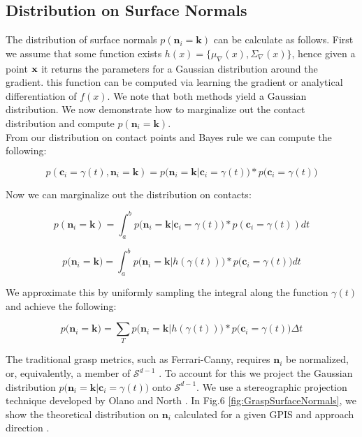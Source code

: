 \documentclass[letterpaper, 10 pt, conference]{ieeeconf}  %
\begin{document}
\subsection{Distribution on Surface Normals} 
The distribution of surface normals $p(\textbf{n}_i = \textbf{k})$ can be calculate as follows.
First we assume that some function exists $h(x) = \lbrace \mu_{\nabla}(x), \Sigma_{\nabla}(x) \rbrace$, hence given a point $\bf{x}$ it returns the parameters for a Gaussian distribution around the gradient.
this function can be computed via learning the gradient \cite{solak2003derivative} or analytical differentiation of $f(x)$.
We note that both methods yield a Gaussian distribution.
We now demonstrate how to marginalize out the contact distribution and compute $p(\textbf{n}_i = \textbf{k})$.\\

From our distribution on contact points and Bayes rule we can compute the following: 

\begin{equation}
p(\textbf{c}_i = \gamma(t), \textbf{n}_i = \textbf{k}) = p\big(\textbf{n}_i = \textbf{k} | \textbf{c}_i = \gamma(t) \big)*p\big(\textbf{c}_i = \gamma(t)\big)
\end{equation}

Now we can marginalize out the distribution on contacts:

\begin{equation}
p(\textbf{n}_i = \textbf{k}) = \int_a^b  p \big(\textbf{n}_i = \textbf{k} | \textbf{c}_i = \gamma(t) \big)*p(\textbf{c}_i = \gamma(t)) dt
\end{equation}

\begin{equation}
p\big(\textbf{n}_i = \textbf{k}\big) = \int_a^b  p \big(\textbf{n}_i = \textbf{k} | h(\gamma(t))\big)*p\big(\textbf{c}_i = \gamma(t)\big) dt
\end{equation}

We approximate this by uniformly sampling the integral along the function $\gamma(t)$ and achieve the following: 

\begin{equation}
p\big( \textbf{n}_i = \textbf{k} \big) = \sum_T  p \big( \textbf{n}_i = \textbf{k} | h(\gamma(t)) \big) *p\big(\textbf{c}_i = \gamma(t)\big) \Delta t
\end{equation}


The traditional grasp metrics, such as  Ferrari-Canny, requires $\textbf{n}_i$ be normalized, or, equivalently, a member of $\mathcal{S}^{d-1}$ \cite{ferrari1992}. To account for this we project the Gaussian distribution $p \big(\textbf{n}_i = \textbf{k} |\textbf{c}_i = \gamma(t) \big)$  onto $\mathcal{S}^{d-1}$. We use a stereographic projection technique developed by Olano and North \cite{olano1997normal}. In Fig.6
\ref{fig:GraspSurfaceNormals}, we show the theoretical distribution on $\textbf{n}_i$ calculated for a given GPIS and approach direction .
\end{document}
